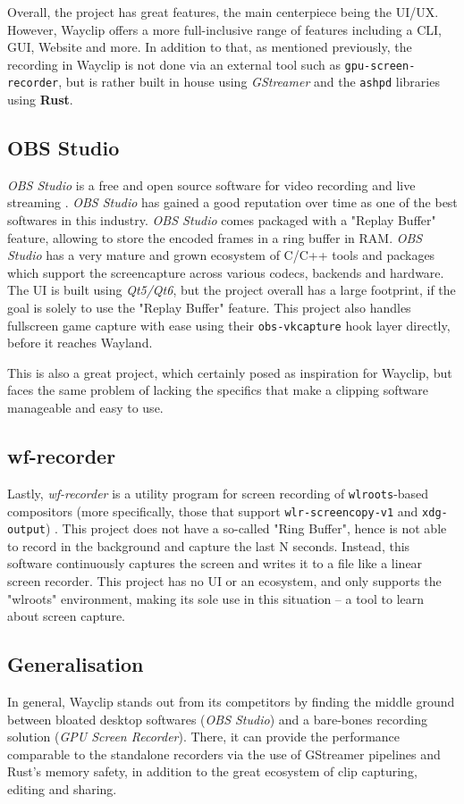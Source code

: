 Overall, the project has great features, the main centerpiece being the UI/UX. However, Wayclip offers a more full-inclusive range of features including a CLI, GUI, Website and more.
In addition to that, as mentioned previously, the recording in Wayclip is not done via an external tool such as \lstinline|gpu-screen-recorder|, but is rather built in house using \emph{GStreamer} and the \lstinline|ashpd| libraries using \textbf{Rust}.

\subsection{OBS Studio}

\emph{OBS Studio} is a free and open source software for video recording and live streaming \cite{obs_studio}. \emph{OBS Studio} has gained a good reputation over time as one of the best softwares in this industry.
\emph{OBS Studio} comes packaged with a "Replay Buffer" feature, allowing to store the encoded frames in a ring buffer in RAM. \emph{OBS Studio} has a very mature and grown ecosystem of C/C++ tools and packages which support the screencapture across various codecs, backends and hardware.
The UI is built using \emph{Qt5/Qt6}, but the project overall has a large footprint, if the goal is solely to use the "Replay Buffer" feature.
This project also handles fullscreen game capture with ease using their \lstinline|obs-vkcapture| hook layer directly, before it reaches Wayland.

This is also a great project, which certainly posed as inspiration for Wayclip, but faces the same problem of lacking the specifics that make a clipping software manageable and easy to use.

\subsection{wf-recorder}

Lastly, \emph{wf-recorder} is a utility program for screen recording of \lstinline|wlroots|-based compositors (more specifically, those that support \lstinline|wlr-screencopy-v1| and \lstinline|xdg-output|) \cite{wf_recorder}.
This project does not have a so-called "Ring Buffer", hence is not able to record in the background and capture the last N seconds. Instead, this software continuously captures the screen and writes it to a file like a linear screen recorder.
This project has no UI or an ecosystem, and only supports the "wlroots" environment, making its sole use in this situation -- a tool to learn about screen capture.

\subsection{Generalisation}

In general, Wayclip stands out from its competitors by finding the middle ground between bloated desktop softwares (\emph{OBS Studio}) and a bare-bones recording solution (\emph{GPU Screen Recorder}).
There, it can provide the performance comparable to the standalone recorders via the use of GStreamer pipelines and Rust's memory safety, in addition to the great ecosystem of clip capturing, editing and sharing.
